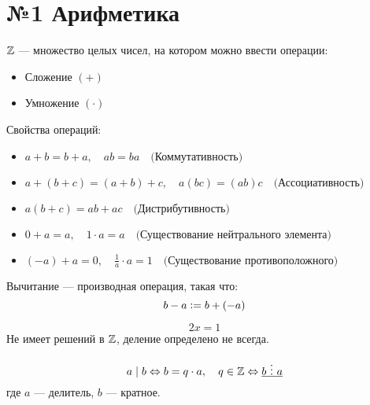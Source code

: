 \iffalse

Оставь надежду, всяк сюда входящий...
Человек, который возможно захочет что-то сюда добавить, или потехать Вялого... просто удачи, я почти на лекции не ходил и поэтому делал по чужим конспектам, поэтому возможно все будет выглядеть сумбурно, но все же... я пытався...

\fi


\section{№1 Арифметика}

\begin{definition}
  $\mathbb{Z}$ --- множество целых чисел, на котором можно ввести операции:
  \begin{itemize}
    \item Сложение $(+)$
    \item Умножение $(\cdot)$
  \end{itemize}
\end{definition}

\begin{lemma}
  Свойства операций:
  \begin{itemize}
    \item $a + b = b + a, \quad ab = ba \quad \text{(Коммутативность)}$
    \item $a + (b + c) = (a + b) + c, \quad a(bc) = (ab)c \quad \text{(Ассоциативность)}$
    \item $a(b + c) = ab + ac \quad \text{(Дистрибутивность)}$
    \item $0 + a = a, \quad 1 \cdot a = a \quad \text{(Существование нейтрального элемента)}$
    \item $(-a) + a = 0, \quad \frac{1}{a} \cdot a = 1 \quad \text{(Существование противоположного)}$
  \end{itemize}
\end{lemma}

\begin{proposition}
  Вычитание --- производная операция, такая что:
  \[b - a \vcentcolon= b + (-a) \]
\end{proposition}

\begin{example}
  \[2x = 1\]
  Не имеет решений в $\mathbb{Z}$, деление определено не всегда.
\end{example}

\begin{definition}
  \[a \mid b \Leftrightarrow b = q \cdot a, \quad q \in \mathbb{Z} \Leftrightarrow \underline{b \  \vdots \ a} \]
  где $a$ --- делитель, $b$ --- кратное.
\end{definition}

